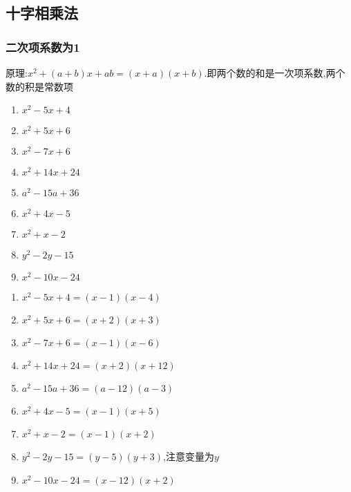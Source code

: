 \documentclass[cn,blue]{elegantbook}
\begin{document}
\subsection{十字相乘法}%
\label{sub:十字相乘法}
\subsubsection{二次项系数为1}%
\label{ssub:二次项系数为1}
原理:\(x^2 +(a+b)x+ab=(x+a)(x+b)\).即两个数的和是一次项系数,两个数的积是常数项
\begin{problem}
    \begin{enumerate}
        \item \(x^2 -5x+4\)
        \item \(x^2 +5x+6\)
        \item \(x^2 -7x+6\)
        \item \(x^2 +14x+24\)
        \item \(a^2 -15a+36\)
        \item \(x^2 +4x-5\)
        \item \(x^2 +x-2\)
        \item \(y^2 -2y-15\)
        \item \(x^2 -10x-24\)
    \end{enumerate}
\end{problem}

\begin{solution}
    \begin{enumerate}
        \item \(x^2 -5x+4=(x-1)(x-4)\)
        \item \(x^2 +5x+6=(x+2)(x+3)\)
        \item \(x^2 -7x+6=(x-1)(x-6)\)
        \item \(x^2 +14x+24=(x+2)(x+12)\)
        \item \(a^2 -15a+36=(a-12)(a-3)\)
        \item \(x^2 +4x-5=(x-1)(x+5)\)
        \item \(x^2 +x-2=(x-1)(x+2)\)
        \item \(y^2 -2y-15=(y-5)(y+3)\),注意变量为\(y\)
        \item \(x^2 -10x-24=(x-12)(x+2)\)
    \end{enumerate}
\end{solution}
\end{document}
